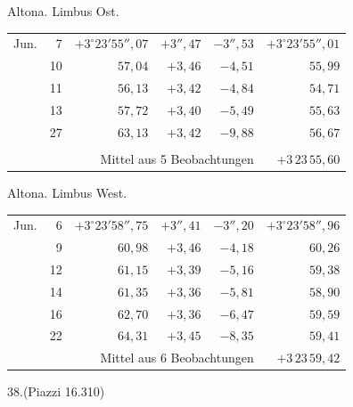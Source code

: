 \noindent\begin{minipage}[t]{.495\textwidth}\centering Altona. Limbus Ost.\par\smallskip
{\scriptsize\setlength{\tabcolsep}{1pt}\renewcommand{\arraystretch}{1.2}\begin{tabular}{lr|r|r|r|r|}
Jun.&7&$+3^\circ23'55''{,}07$&$+3''{,}47$&$-3''{,}53$&$+3^\circ23'55''{,}01$\\
&10&$57{,}04$&$+3{,}46$&$-4{,}51$&$55{,}99$\\
&11&$56{,}13$&$+3{,}42$&$-4{,}84$&$54{,}71$\\
&13&$57{,}72$&$+3{,}40$&$-5{,}49$&$55{,}63$\\
&27&$63{,}13$&$+3{,}42$&$-9{,}88$&$56{,}67$\\
&&&&&\\
\cline{6-6}\multicolumn{5}{r}{Mittel aus 5 Beobachtungen}&$+3\,23\,55{,}60$
\end{tabular}}\end{minipage}\hfill\begin{minipage}[t]{.495\textwidth}\centering Altona. Limbus West.\par\smallskip
{\scriptsize\setlength{\tabcolsep}{1pt}\renewcommand{\arraystretch}{1.2}\begin{tabular}{lr|r|r|r|r}
Jun.&6&$+3^\circ23'58''{,}75$&$+3''{,}41$&$-3''{,}20$&$+3^\circ23'58''{,}96$\\
&9&$60{,}98$&$+3{,}46$&$-4{,}18$&$60{,}26$\\
&12&$61{,}15$&$+3{,}39$&$-5{,}16$&$59{,}38$\\
&14&$61{,}35$&$+3{,}36$&$-5{,}81$&$58{,}90$\\
&16&$62{,}70$&$+3{,}36$&$-6{,}47$&$59{,}59$\\
&22&$64{,}31$&$+3{,}45$&$-8{,}35$&$59{,}41$\\
\cline{6-6}\multicolumn{5}{r}{Mittel aus 6 Beobachtungen}&$+3\,23\,59{,}42$
\end{tabular}}\end{minipage}
\par\vspace{4mm}
\begin{center}38.\quad (Piazzi 16.310)\end{center}

